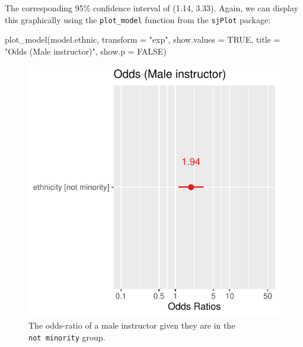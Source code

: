 \documentclass[
  letterpaper,
  DIV=11,
  numbers=noendperiod]{scrartcl}
\newenvironment{Shaded}{\begin{snugshade}}{\end{snugshade}}
\newcommand{\AttributeTok}[1]{\textcolor[rgb]{0.40,0.45,0.13}{#1}}
\newcommand{\ConstantTok}[1]{\textcolor[rgb]{0.56,0.35,0.01}{#1}}
\newcommand{\FunctionTok}[1]{\textcolor[rgb]{0.28,0.35,0.67}{#1}}
\newcommand{\NormalTok}[1]{\textcolor[rgb]{0.00,0.23,0.31}{#1}}
\newcommand{\StringTok}[1]{\textcolor[rgb]{0.13,0.47,0.30}{#1}}
\begin{document}
The corresponding 95\% confidence interval of (1.14, 3.33). Again, we
can display this graphically using the \texttt{plot\_model} function
from the \texttt{sjPlot} package:

\begin{Shaded}
\begin{Highlighting}[]
\FunctionTok{plot\_model}\NormalTok{(model.ethnic,}
           \AttributeTok{transform =} \StringTok{"exp"}\NormalTok{,}
           \AttributeTok{show.values =} \ConstantTok{TRUE}\NormalTok{,}
           \AttributeTok{title =} \StringTok{"Odds (Male instructor)"}\NormalTok{,}
           \AttributeTok{show.p =} \ConstantTok{FALSE}\NormalTok{)}
\end{Highlighting}
\end{Shaded}

\begin{figure}[H]

{\centering \includegraphics{index_files/figure-pdf/unnamed-chunk-51-1.pdf}

}

\caption{The odds-ratio of a male instructor given they are in the
\texttt{not\ minority} group.}

\end{figure}%
\end{document}
